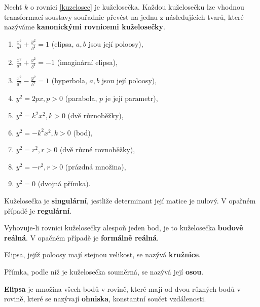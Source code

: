 \begin{definition}
    Nechť $k$ o rovnici \ref{kuzelosec} je kuželosečka. Každou kuželosečku lze
    vhodnou transformací soustavy souřadnic převést na jednu z následujících
    tvarů, které nazýváme \textbf{kanonickými rovnicemi kuželosečky}.
    \begin{enumerate}[$i.$]
    \item $\frac{x^2}{a^2} + \frac{y^2}{b^2}=1$ (elipsa, $a,b$ jsou její poloosy),
   	\item $\frac{x^2}{a^2} + \frac{y^2}{b^2}=-1$ (imaginární elipsa),
   	\item $\frac{x^2}{a^2} - \frac{y^2}{b^2}=1$ (hyperbola, $a,b$ jsou její poloosy),
   	\item $y^2=2px, p>0$ (parabola, $p$ je její parametr),
   	\item $y^2 = k^2x^2, k>0$ (dvě různoběžky),
   	\item $y^2 = -k^2x^2, k>0$ (bod),
   	\item $y^2 = r^2, r>0$ (dvě různé rovnoběžky),
   	\item $y^2 = -r^2, r>0$ (prázdná množina),
   	\item $y^2=0$ (dvojná přímka).
    \end{enumerate}
\end{definition}

\begin{definition}
    Kuželosečka je \textbf{singulární}, jestliže determinant její matice je nulový.
    V opařném případě je \textbf{regulární}.
\end{definition}

\begin{definition}
    Vyhovuje-li rovnici kuželosečky alespoň jeden bod, je to kuželosečka
    \textbf{bodově reálná}. V opačném případě je \textbf{formálně reálná}.
\end{definition}

\begin{definition}
    Elipsa, jejíž poloosy mají stejnou velikost, se nazývá \textbf{kružnice}.
\end{definition}

\begin{definition}
    Přímka, podle níž je kuželosečka souměrná, se nazývá její \textbf{osou}.
\end{definition}

\begin{definition}
\textbf{Elipsa} je množina všech bodů v rovině, které mají od dvou různých bodů v rovině,
které se nazývají \textbf{ohniska}, konstantní součet vzdálenosti.
\end{definition}


